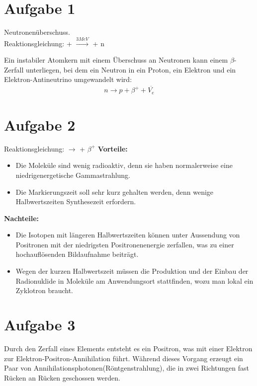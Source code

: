 \section{Aufgabe 1}
Neutronenüberschuss. \\
Reaktionsgleichung:  +  $\xrightarrow{3 MeV}$  + n   \newline

Ein instabiler Atomkern mit einem Überschuss an Neutronen kann einem $\beta$-Zerfall unterliegen, bei dem ein Neutron in ein Proton, ein Elektron und ein Elektron-Antineutrino umgewandelt wird:
\begin{align*}
    n \longrightarrow p + \beta^+ + \overline{V_e}
\end{align*}
\section{Aufgabe 2}
Reaktionsgleichung:  $\longrightarrow$  + $\beta^+$ \newline \newline
\textbf{Vorteile: }
\begin{itemize}
    \item Die Moleküle sind wenig radioaktiv, denn sie haben normalerweise eine niedrigenergetische Gammastrahlung.
    \item Die Markierungszeit soll sehr kurz gehalten werden, denn wenige Halbwertszeiten Synthesezeit erfordern.
\end{itemize}

\textbf{Nachteile:}
\begin{itemize}
    \item Die Isotopen mit längeren Halbwertszeiten können unter Aussendung von Positronen mit der niedrigsten Positronenenergie zerfallen, was zu einer hochauflösenden Bildaufnahme beiträgt.
    \item Wegen der kurzen Halbwertszeit müssen die Produktion und der Einbau der Radionuklide in Moleküle am Anwendungsort stattfinden, wozu man lokal ein Zyklotron braucht. 
\end{itemize}

\section{Aufgabe 3}
Durch den Zerfall eines Elements entsteht es ein Positron, was mit einer Elektron zur Elektron-Positron-Annihilation führt. Während dieses Vorgang erzeugt ein Paar von Annihilationsphotonen(Röntgenstrahlung), die in zwei Richtungen fast Rücken an Rücken geschossen werden.

